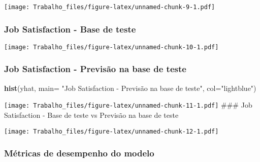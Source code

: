 \documentclass[]{article}
\newenvironment{Shaded}{\begin{snugshade}}{\end{snugshade}}
\newcommand{\KeywordTok}[1]{\textcolor[rgb]{0.13,0.29,0.53}{\textbf{#1}}}
\newcommand{\DataTypeTok}[1]{\textcolor[rgb]{0.13,0.29,0.53}{#1}}
\newcommand{\StringTok}[1]{\textcolor[rgb]{0.31,0.60,0.02}{#1}}
\newcommand{\OperatorTok}[1]{\textcolor[rgb]{0.81,0.36,0.00}{\textbf{#1}}}
\newcommand{\NormalTok}[1]{#1}
\begin{document}
\texttt{[image: Trabalho\_files/figure-latex/unnamed-chunk-9-1.pdf]}

\subsubsection{Job Satisfaction - Base de
teste}\label{job-satisfaction---base-de-teste}

\begin{Shaded}
\end{Shaded}

\texttt{[image: Trabalho\_files/figure-latex/unnamed-chunk-10-1.pdf]}

\subsubsection{Job Satisfaction - Previsão na base de
teste}\label{job-satisfaction---previsao-na-base-de-teste}

\begin{Shaded}
\begin{Highlighting}[]
\KeywordTok{hist}\NormalTok{(yhat, }\DataTypeTok{main=} \StringTok{"Job Satisfaction - Previsão na base de teste"}\NormalTok{, }\DataTypeTok{col=}\StringTok{"lightblue"}\NormalTok{)}
\end{Highlighting}
\end{Shaded}

\texttt{[image: Trabalho\_files/figure-latex/unnamed-chunk-11-1.pdf]}
\#\#\# Job Satisfaction - Base de teste vs Previsão na base de teste

\begin{Shaded}
\end{Shaded}

\texttt{[image: Trabalho\_files/figure-latex/unnamed-chunk-12-1.pdf]}

\subsubsection{Métricas de desempenho do
modelo}\label{metricas-de-desempenho-do-modelo}
\end{document}
